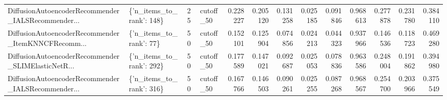 \begin{tabular}{llllrrrrrrrrr}
DiffusionAutoencoderRecommender\_IALSRecommender... & \{'n\_items\_to\_rank': 148\} &       25 & cutoff\_50 & 0.228227 &   0.205120 & 0.131258 & 0.025185 &        0.091846 &                   0.968613 &       0.277878 &           0.231780 &            0.384110 \\
DiffusionAutoencoderRecommender\_ItemKNNCFRecomm... &  \{'n\_items\_to\_rank': 77\} &       50 & cutoff\_50 & 0.152101 &   0.125904 & 0.074856 & 0.024213 &        0.044323 &                   0.937966 &       0.146536 &           0.118723 &            0.469280 \\
DiffusionAutoencoderRecommender\_SLIMElasticNetR... & \{'n\_items\_to\_rank': 292\} &       50 & cutoff\_50 & 0.177589 &   0.147021 & 0.092687 & 0.025053 &        0.078836 &                   0.963586 &       0.248004 &           0.191862 &            0.394980 \\
DiffusionAutoencoderRecommender\_IALSRecommender... & \{'n\_items\_to\_rank': 316\} &       50 & cutoff\_50 & 0.167766 &   0.146503 & 0.090261 & 0.025255 &        0.087268 &                   0.968567 &       0.254700 &           0.203966 &            0.375549 \\
\bottomrule
\end{tabular}
